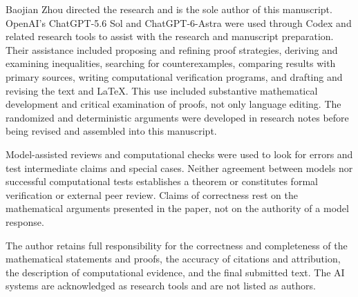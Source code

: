 Baojian Zhou directed the research and is the sole author of this manuscript.
OpenAI's ChatGPT-5.6 Sol and ChatGPT-6-Astra were used through Codex and
related research tools to assist with the research and manuscript
preparation. Their assistance included proposing and refining proof
strategies, deriving and examining inequalities, searching for
counterexamples, comparing results with primary sources, writing
computational verification programs, and drafting and revising the text
and LaTeX. This use included substantive mathematical development and
critical examination of proofs, not only language editing. The randomized
and deterministic arguments were developed in research notes before being
revised and assembled into this manuscript.

Model-assisted reviews and computational checks were used to look for
errors and test intermediate claims and special cases. Neither agreement
between models nor successful computational tests establishes a theorem
or constitutes formal verification or external peer review. Claims of
correctness rest on the mathematical arguments presented in the paper,
not on the authority of a model response.

The author retains full responsibility for the correctness and completeness
of the mathematical statements and proofs, the accuracy of citations and
attribution, the description of computational evidence, and the final
submitted text. The AI systems are acknowledged as research tools and are
not listed as authors.
